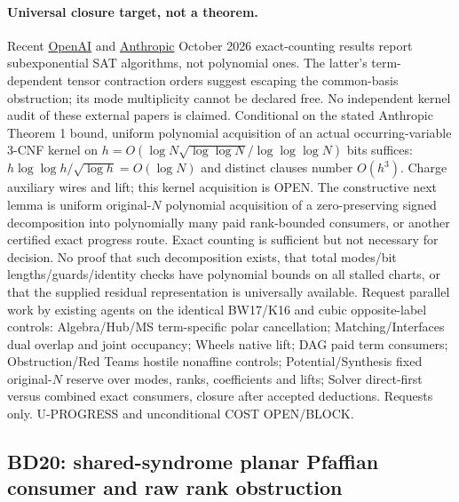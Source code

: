 \documentclass[11pt]{article}
\begin{document}
\paragraph{Universal closure target, not a theorem.}
Recent \href{https://github.com/openai/math/tree/main/preprints/The-Exponential-Time-Hypothesis-is-False-October-25-2026}{OpenAI} and \href{https://hexagonmath.org/2610.00577}{Anthropic} October 2026 exact-counting results report subexponential SAT algorithms, not polynomial ones. The latter's term-dependent tensor contraction orders suggest escaping the common-basis obstruction; its mode multiplicity cannot be declared free. No independent kernel audit of these external papers is claimed. Conditional on the stated Anthropic Theorem 1 bound, uniform polynomial acquisition of an actual occurring-variable 3-CNF kernel on
$h=O(\log N\sqrt{\log\log N}/\log\log\log N)$ bits suffices: $h\log\log h/\sqrt{\log h}=O(\log N)$ and distinct clauses number $O(h^3)$. Charge auxiliary wires and lift; this kernel acquisition is OPEN. The constructive next lemma is uniform original-$N$ polynomial acquisition of a zero-preserving signed decomposition into polynomially many paid rank-bounded consumers, or another certified exact progress route. Exact counting is sufficient but not necessary for decision. No proof that such decomposition exists, that total modes/bit lengths/guards/identity checks have polynomial bounds on all stalled charts, or that the supplied residual representation is universally available. Request parallel work by existing agents on the identical BW17/K16 and cubic opposite-label controls: Algebra/Hub/MS term-specific polar cancellation; Matching/Interfaces dual overlap and joint occupancy; Wheels native lift; DAG paid term consumers; Obstruction/Red Teams hostile nonaffine controls; Potential/Synthesis fixed original-$N$ reserve over modes, ranks, coefficients and lifts; Solver direct-first versus combined exact consumers, closure after accepted deductions. Requests only. U-PROGRESS and unconditional COST OPEN/BLOCK.

\subsection{BD20: shared-syndrome planar Pfaffian consumer and raw rank obstruction}\label{sec:bd20}
\end{document}
